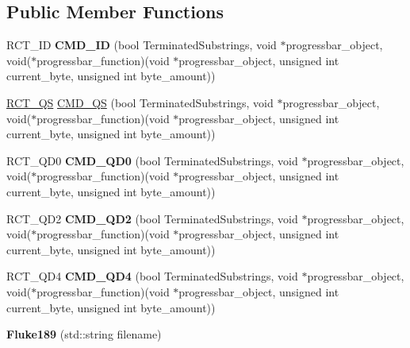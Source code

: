 \subsection*{Public Member Functions}
\begin{DoxyCompactItemize}
\item 
\hypertarget{classFluke_1_1Fluke189_aa08fa7232a4af887744b63f59959b050}{
RCT\_\-ID {\bfseries CMD\_\-ID} (bool TerminatedSubstrings, void $\ast$progressbar\_\-object, void($\ast$progressbar\_\-function)(void $\ast$progressbar\_\-object, unsigned int current\_\-byte, unsigned int byte\_\-amount))}
\label{classFluke_1_1Fluke189_aa08fa7232a4af887744b63f59959b050}

\item 
\hyperlink{classFluke_1_1Fluke189_a9fee860a536aaaa113af0248791e9fef}{RCT\_\-QS} \hyperlink{classFluke_1_1Fluke189_a5747ae5dbcc0d078566dd8ff28c3d6b5}{CMD\_\-QS} (bool TerminatedSubstrings, void $\ast$progressbar\_\-object, void($\ast$progressbar\_\-function)(void $\ast$progressbar\_\-object, unsigned int current\_\-byte, unsigned int byte\_\-amount))
\item 
\hypertarget{classFluke_1_1Fluke189_ac33f3b840c907949b5b7e479f65c11d5}{
RCT\_\-QD0 {\bfseries CMD\_\-QD0} (bool TerminatedSubstrings, void $\ast$progressbar\_\-object, void($\ast$progressbar\_\-function)(void $\ast$progressbar\_\-object, unsigned int current\_\-byte, unsigned int byte\_\-amount))}
\label{classFluke_1_1Fluke189_ac33f3b840c907949b5b7e479f65c11d5}

\item 
\hypertarget{classFluke_1_1Fluke189_afca3f8241ae8dc89691b0fb8f5d3cbad}{
RCT\_\-QD2 {\bfseries CMD\_\-QD2} (bool TerminatedSubstrings, void $\ast$progressbar\_\-object, void($\ast$progressbar\_\-function)(void $\ast$progressbar\_\-object, unsigned int current\_\-byte, unsigned int byte\_\-amount))}
\label{classFluke_1_1Fluke189_afca3f8241ae8dc89691b0fb8f5d3cbad}

\item 
\hypertarget{classFluke_1_1Fluke189_a4e942819669368247858a39003f2bf9f}{
RCT\_\-QD4 {\bfseries CMD\_\-QD4} (bool TerminatedSubstrings, void $\ast$progressbar\_\-object, void($\ast$progressbar\_\-function)(void $\ast$progressbar\_\-object, unsigned int current\_\-byte, unsigned int byte\_\-amount))}
\label{classFluke_1_1Fluke189_a4e942819669368247858a39003f2bf9f}

\item 
\hypertarget{classFluke_1_1Fluke189_a2a8bd6a44e96762e278809e016033e58}{
{\bfseries Fluke189} (std::string filename)}
\label{classFluke_1_1Fluke189_a2a8bd6a44e96762e278809e016033e58}

\end{DoxyCompactItemize}


